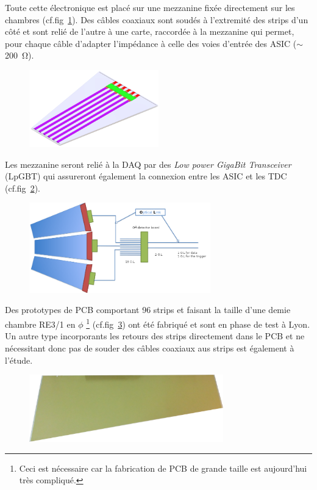 Toute cette électronique est placé sur une mezzanine fixée directement sur les chambres (cf.fig~\ref{chamber}). Des câbles coaxiaux sont soudés à l'extremité des strips d'un côté et sont relié de l'autre à une carte, raccordée à la mezzanine qui permet, pour chaque câble d'adapter l'impédance à celle des voies d'entrée des ASIC ($\sim$\SI{200}{\ohm}).  

\begin{figure}[ht!]
	\centering
	\includegraphics[width=0.50\textwidth]{CON/chambre.png}
	\label{chamber}
\end{figure}

Les mezzanine seront relié à la DAQ par des \textit{Low power GigaBit Transceiver} (LpGBT) qui assureront également la connexion entre les ASIC et les TDC (cf.fig~\ref{chambres}). 

\begin{figure}[ht!]
	\centering
	\includegraphics[width=0.70\textwidth]{CON/chambres.png}
	\label{chambres}
\end{figure}

Des prototypes de PCB comportant \num{96} strips et faisant la taille d'une demie chambre RE3/1 en $\phi$ \footnote{Ceci est nécessaire car la fabrication de PCB de grande taille est aujourd'hui très compliqué.} (cf.fig~\ref{proto}) ont été fabriqué et sont en phase de test à Lyon. Un autre type incorporants les retours des strips directement dans le PCB et ne nécessitant donc pas de souder des câbles coaxiaux aus strips est également à l'étude.

\begin{figure}[ht!]
	\centering
	\includegraphics[width=0.75\textwidth]{CON/proto.png}
	\label{proto}
\end{figure}